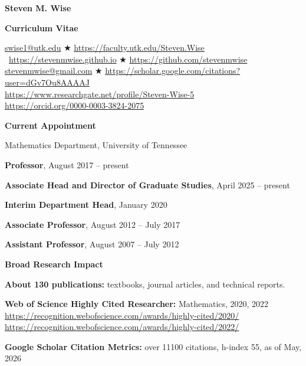 \documentclass[11pt]{letter}
\begin{document}
    
    \begin{center}
    
{\Huge\bf  Steven M. Wise}

{\Large\bf  Curriculum Vitae}


\url{swise1@utk.edu}  $\bigstar$  \url{https://faculty.utk.edu/Steven.Wise}
	\
\url{https://stevenmwise.github.io}  $\bigstar$    \url{https://github.com/stevenmwise}
	\\
\url{stevenmwise@gmail.com}  $\bigstar$   \url{https://scholar.google.com/citations?user=dGv7Ou8AAAAJ}
	\\
\url{https://www.researchgate.net/profile/Steven-Wise-5}
	\\
\url{https://orcid.org/0000-0003-3824-2075}
    \end{center}

    \medskip

{\LARGE\bf  Current Appointment}
    \begin{description}
    \item
Mathematics Department, University of Tennessee
	\begin{description}
	\item
\textbf{Professor}, August 2017 -- present
	\item
\textbf{Associate Head and Director of Graduate Studies}, April 2025 -- present
	\item
\textbf{Interim Department Head}, January 2020
	\item
\textbf{Associate Professor}, August 2012 -- July 2017
	\item
\textbf{Assistant Professor}, August 2007 -- July 2012
	\end{description}
	\end{description}
	
	\smallskip
	
{\LARGE\bf Broad Research Impact}
    \begin{description}
    \item
\textbf{About 130 publications:} textbooks, journal articles, and technical reports.
    \item
\textbf{Web of Science Highly Cited Researcher:} Mathematics, 2020, 2022
	\\
\url{https://recognition.webofscience.com/awards/highly-cited/2020/}
	\\
\url{https://recognition.webofscience.com/awards/highly-cited/2022/}
   	\item
\textbf{Google Scholar Citation Metrics:} over 11100 citations, h-index 55, as of May, 2026
    \end{description}
    
\end{document}
